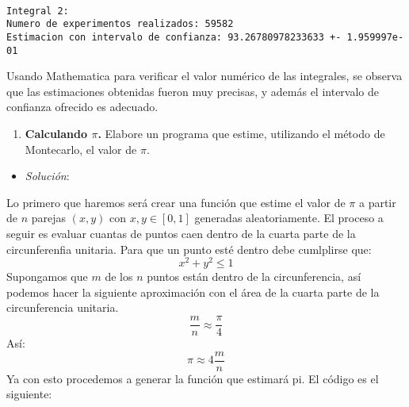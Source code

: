 \documentclass[11pt]{article}
\providecommand{\tightlist}{%
      \setlength{\itemsep}{0pt}\setlength{\parskip}{0pt}}
\begin{document}
    \begin{Verbatim}[commandchars=\\\{\}]

Integral 2:
Numero de experimentos realizados: 59582
Estimacion con intervalo de confianza: 93.26780978233633 +- 1.959997e-01
    \end{Verbatim}

    Usando Mathematica para verificar el valor numérico de las integrales,
se observa que las estimaciones obtenidas fueron muy precisas, y además
el intervalo de confianza ofrecido es adecuado.

    \begin{enumerate}
\def\labelenumi{\arabic{enumi}.}
\setcounter{enumi}{2}
\tightlist
\item
  \textbf{Calculando \(\pi\).} Elabore un programa que estime,
  utilizando el método de Montecarlo, el valor de \(\pi\).
\end{enumerate}

    \begin{itemize}
\tightlist
\item
  \emph{Solución}:
\end{itemize}

Lo primero que haremos será crear una función que estime el valor de
\(\pi\) a partir de \(n\) parejas \((x,y)\) con \(x,y\in [0,1]\)
generadas aleatoriamente. El proceso a seguir es evaluar cuantas de
puntos caen dentro de la cuarta parte de la circunferenfia unitaria.
Para que un punto esté dentro debe cumlplirse que: \[x^2+y^2\leq 1\]
Supongamos que \(m\) de los \(n\) puntos están dentro de la
circunferencia, así podemos hacer la siguiente aproximación con el área
de la cuarta parte de la circunferencia unitaria.
\[\frac{m}{n}\approx \frac{\pi}{4}\] Así: \[\pi\approx 4\frac{m}{n}\] Ya
con esto procedemos a generar la función que estimará pi. El código es
el siguiente:
\end{document}
